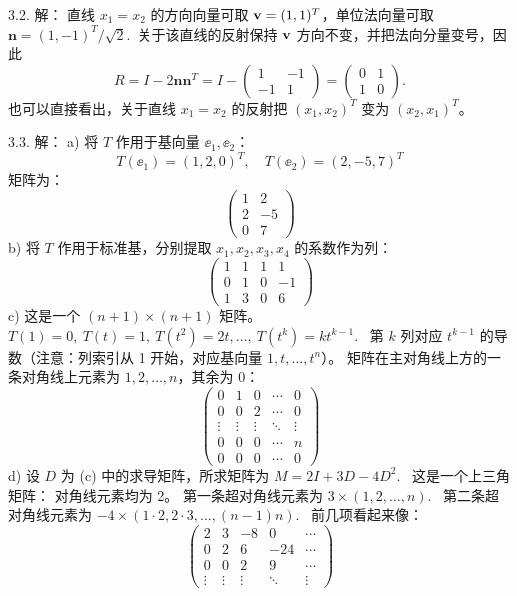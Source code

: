 \begin{exer}
3.2. 解：
直线 $x_1=x_2$ 的方向向量可取 $\mathbf{v}=(1,1)^T$，单位法向量可取 $\mathbf{n}=(1,-1)^T/\sqrt2$.~关于该直线的反射保持 $\mathbf{v}$ 方向不变，并把法向分量变号，因此
$$
R=I-2\mathbf{n}\mathbf{n}^T
 = I-\begin{pmatrix}1&-1\\-1&1\end{pmatrix}
 = \begin{pmatrix}0&1\\1&0\end{pmatrix}.
$$
也可以直接看出，关于直线 $x_1=x_2$ 的反射把 $(x_1,x_2)^T$ 变为 $(x_2,x_1)^T$。

3.3. 解：
a) 将 $T$ 作用于基向量 $\ee_1, \ee_2$：
$$ T(\ee_1) = (1, 2, 0)^T, \quad T(\ee_2) = (2, -5, 7)^T $$
矩阵为：
$$ \begin{pmatrix} 1 & 2 \\ 2 & -5 \\ 0 & 7 \end{pmatrix} $$
b) 将 $T$ 作用于标准基，分别提取 $x_1, x_2, x_3, x_4$ 的系数作为列：
$$ \begin{pmatrix} 1 & 1 & 1 & 1 \\ 0 & 1 & 0 & -1 \\ 1 & 3 & 0 & 6 \end{pmatrix} $$
c) 这是一个 $(n+1) \times (n+1)$ 矩阵。
$T(1) = 0, \ T(t) = 1, \ T(t^2) = 2t, \dots, \ T(t^k) = k t^{k-1}$.~
第 $k$ 列对应 $t^{k-1}$ 的导数（注意：列索引从 1 开始，对应基向量 $1, t, \dots, t^n$）。
矩阵在主对角线上方的一条对角线上元素为 $1, 2, \dots, n$，其余为 0：
$$
\begin{pmatrix}
0 & 1 & 0 & \cdots & 0 \\
0 & 0 & 2 & \cdots & 0 \\
\vdots & \vdots & \vdots & \ddots & \vdots \\
0 & 0 & 0 & \cdots & n \\
0 & 0 & 0 & \cdots & 0
\end{pmatrix}
$$
d) 设 $D$ 为 (c) 中的求导矩阵，所求矩阵为 $M = 2I + 3D - 4D^2$.~
这是一个上三角矩阵：
对角线元素均为 2。
第一条超对角线元素为 $3 \times (1, 2, \dots, n)$.~
第二条超对角线元素为 $-4 \times (1\cdot 2, 2\cdot 3, \dots, (n-1)n)$.~
前几项看起来像：
$$
\begin{pmatrix}
2 & 3 & -8 & 0 & \cdots \\
0 & 2 & 6 & -24 & \cdots \\
0 & 0 & 2 & 9 & \cdots \\
\vdots & \vdots & \vdots & \ddots & \vdots
\end{pmatrix}
$$


\end{exer}
